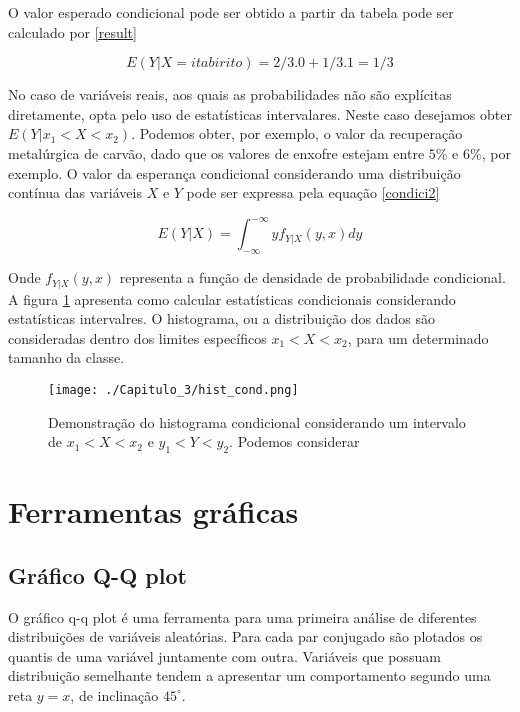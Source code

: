 O valor esperado condicional pode ser obtido a partir da tabela pode ser calculado por \eqref{result}

\begin{equation}\label{result}
E(Y|X=itabirito) = 2/3.0 + 1/3.1 = 1/3
\end{equation}

No caso de variáveis reais, aos quais as probabilidades não são explícitas diretamente, opta pelo uso de estatísticas intervalares. Neste caso desejamos obter $E(Y| x_{1}<X<x_{2})$. Podemos obter, por exemplo, o valor da recuperação metalúrgica de carvão, dado que os valores de enxofre estejam entre $5\%$ e $6\%$, por exemplo.  O valor da esperança condicional considerando uma distribuição contínua das variáveis $X$ e $Y$ pode ser expressa pela equação \eqref{condici2}

 \begin{equation}\label{condici2}
 E(Y|X) = \int_{-\infty}^{-\infty} y f_{Y|X}(y,x) dy
 \end{equation}

Onde $f_{Y|X}(y,x)$ representa a função de densidade de probabilidade condicional. A figura \ref{histcond} apresenta como calcular estatísticas condicionais considerando estatísticas intervalres. O histograma, ou a distribuição dos dados são consideradas dentro dos limites específicos $x_{1}<X<x_{2}$, para um determinado tamanho da classe. 

\FloatBarrier
\begin{figure}[!htpb]
	\centering
	\texttt{[image: ./Capitulo\_3/hist\_cond.png]}	
	\caption{Demonstração do histograma condicional considerando um intervalo de $x_{1}<X<x_{2}$ e $y_{1}<Y<y_{2}$. Podemos considerar  }
	\label{histcond}
\end{figure} 
\FloatBarrier

\section{Ferramentas gráficas}

\subsection{Gráfico Q-Q plot}

O gráfico q-q plot é uma ferramenta para uma primeira análise de diferentes distribuições de variáveis aleatórias. Para cada par conjugado são plotados os quantis de uma variável juntamente com outra. Variáveis que possuam distribuição semelhante tendem a apresentar um comportamento segundo uma reta $y=x$, de inclinação $45^{\circ}$. 

